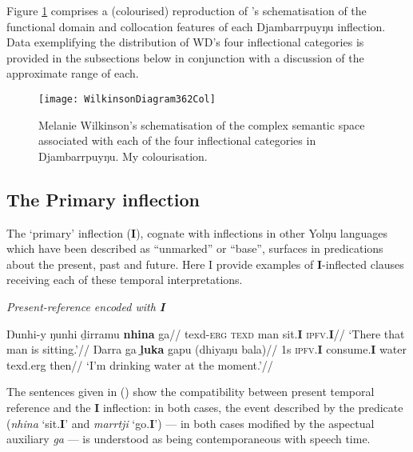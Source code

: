  Figure \ref{WilkDia} comprises a (colourised) reproduction of \citeauthor{Wilkinson1991}'s schematisation of the functional domain and collocation features of each Djambarrpuyŋu inflection. Data exemplifying the distribution of WD's four inflectional categories is provided in the subsections below in conjunction with a discussion of the approximate range of each.

\begin{figure}[h]\caption{Melanie Wilkinson's \citeyearpar[326]{Wilkinson1991} schematisation of the complex semantic space associated with each of the four inflectional categories in Djambarrpuyŋu. My colourisation.}\label{WilkDia}\centering
	\texttt{[image: WilkinsonDiagram362Col]}
\end{figure}

\subsection{The Primary inflection}\label{desc-i}

The `primary' inflection (\textbf{I}), cognate with inflections in other Yolŋu languages which have been described as ``unmarked'' or ``base'', surfaces in predications about the present, past and future. Here I provide examples of \textbf{I}-inflected clauses receiving each of these temporal interpretations.

\pex\textit{ Present-reference encoded with \textbf{I}}

\a\begingl{}
\gla Ŋunhi-y ŋunhi ḏirramu \textbf{nhina} ga//
\glb \gls{texd}\textsc{-erg} \textsc{texd} man sit.\textbf{I} \textsc{ipfv.\textbf{I}}//
\glft`There that man is sitting.'// 
\endgl
\a\begingl\gla Ŋarra ga \textbf{ḻuka} gapu (dhiyaŋu bala)//
\glb 1s \textsc{ipfv.\textbf{I}} consume.\textbf{I} water \gls{texd}.\gls{erg} then//
\glft`I'm drinking water at the moment.'\trailingcitation{[DhG 20190405]}//\endgl
\xe

The sentences given in () show the compatibility between present temporal reference and the \textbf{I} inflection: in both cases, the event described by the predicate (\textit{nhina} `sit.\textbf{I}' and \textit{marrtji} `go.\textbf{I}') --- in both cases modified by the aspectual auxiliary \textit{ga} --- is understood as being contemporaneous with speech time. %

